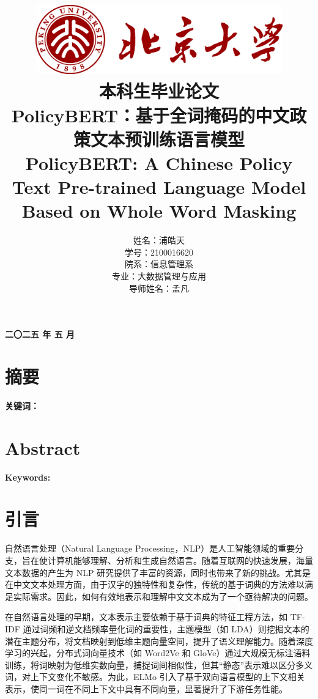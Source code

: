 \documentclass[12pt, a4paper]{ctexart}
\title{
    \includegraphics[width=0.8\textwidth]{./images/logo.png} \\[1em] %
    {\fontsize{40pt}{24pt}\selectfont \heiti 本科生毕业论文} \\[2em] %
    \heiti PolicyBERT：基于全词掩码的中文政策文本预训练语言模型 \\[1em]
    PolicyBERT: A Chinese Policy Text Pre-trained Language Model Based on Whole Word Masking  \\[3em] %
}
\author{姓名：浦皓天 \\
学号：2100016620 \\
院系：信息管理系 \\
专业：大数据管理与应用 \\
导师姓名：孟凡}
\date{}
\begin{document}
\maketitle
\vfill %
\begin{center}
    \textbf{二〇二五 年 五 月} \\[1em] %
\end{center}

\newpage
\section*{摘要}

\vspace{2em} %

\textbf{关键词：}
\vspace{2em} %

\newpage
\section*{Abstract}


\vspace{2em} %

\textbf{Keywords:} 

\newpage
\tableofcontents %
\newpage


\section{引言}
自然语言处理（Natural Language Processing，NLP）是人工智能领域的重要分支，旨在使计算机能够理解、分析和生成自然语言。随着互联网的快速发展，海量文本数据的产生为 NLP 研究提供了丰富的资源，同时也带来了新的挑战。尤其是在中文文本处理方面，由于汉字的独特性和复杂性，传统的基于词典的方法难以满足实际需求。因此，如何有效地表示和理解中文文本成为了一个亟待解决的问题。

在自然语言处理的早期，文本表示主要依赖于基于词典的特征工程方法，如 TF-IDF 通过词频和逆文档频率量化词的重要性\cite{SALTON1988513}，主题模型（如 LDA）则挖掘文本的潜在主题分布，将文档映射到低维主题向量空间，提升了语义理解能力\cite{10.5555/944919.944937}。随着深度学习的兴起，分布式词向量技术（如 Word2Ve\cite{mikolov2013efficientestimationwordrepresentations} 和 GloVe\cite{pennington-etal-2014-glove}）通过大规模无标注语料训练，将词映射为低维实数向量，捕捉词间相似性，但其“静态”表示难以区分多义词，对上下文变化不敏感。为此，ELMo 引入了基于双向语言模型的上下文相关表示，使同一词在不同上下文中具有不同向量，显著提升了下游任务性能\cite{peters-etal-2018-deep}。
\end{document}
